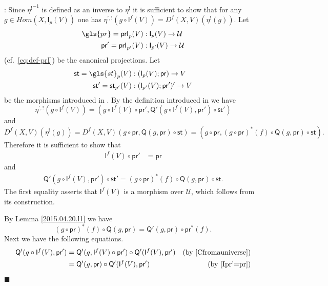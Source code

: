 \documentclass[12pt]{article}
\numberwithin{equation}{section}
\newenvironment{myproof}{{\bf Proof}:}{$\blacksquare$ \vskip 5mm }
\newcommand{\by}[1]{\text{(by #1)}}
\newcommand{\sr}{\rightarrow}
\newcommand{\U}{\mathcal{U}}
\newcommand{\I}{\mathsf{I}}
\newcommand{\Q}{\mathsf{Q}}
\newcommand{\etashriek}{\eta^!}
\newcommand{\etaunshriek}{{\etashriek}^{-1}}
\newcommand{\st}{\mathsf{st}}
\newcommand{\pr}{\mathsf{pr}}
\newcommand{\prI}{\mathsf{prI}}
\begin{document}
\begin{myproof}
Since $\etaunshriek$ is defined as an inverse to $\etashriek$ it is sufficient to show that
for any $g\in Hom(X,\I_p(V))$ one has $\eta^{',!}(g\circ
\I^f(V))=D^f(X,V)(\etashriek(g))$. Let
%
\begin{align*}
  \gls{pr}=\prI_p(V) & :\I_p(V)\sr \U \\
  \pr'=\prI_{p'}(V) & :\I_{p'}(V)\sr \U
\end{align*}
%
(cf.\ \eqref{eq:def-prI}) be the canonical projections. Let
%
\begin{align*}
  \st=\gls{st}_p(V)&:(\I_p(V);\pr)\sr V \\
  \st'=\st_{p'}(V)&:(\I_{p'}(V);\pr')'\sr V
\end{align*}
%
be the morphisms introduced in \cite[(2.60)]{presheavesOb}. By the definition introduced in \cite[(2.65)]{presheavesOb} we have
%
$$\eta^{',!}(g\circ \I^f(V))=(g\circ \I^f(V)\circ \pr', \Q'(g\circ \I^f(V), \pr')\circ \st')$$
%
and
%
$$D^f(X,V)(\etashriek(g))=D^f(X,V)(g\circ \pr, \Q(g,\pr)\circ \st)=(g\circ \pr, (g\circ \pr)^*(f)\circ \Q(g,\pr)\circ \st).$$
%
Therefore it is sufficient to show that
%
\begin{align}
  \I^f(V)\circ \pr' & =\pr \label{Ipr'=pr}
\end{align}
%
and
%
\begin{align}
   \Q'(g\circ \I^f(V), \pr')\circ \st'=(g\circ \pr)^*(f)\circ \Q(g,\pr)\circ \st.     \label{Q'stnat}
\end{align}
%
The first equality asserts that $\I^f(V)$ is a morphism over $\U$, which follows
from its construction.

By Lemma \ref{2015.04.20.l1} we have
%
\[(g\circ \pr)^*(f)\circ \Q(g,\pr)=\Q'(g,\pr)\circ \pr^*(f).\]
%
Next we have the following equations.
%
\begin{align*}
  \Q'(g\circ \I^f(V), \pr')
  & =\Q'(g,\I^f(V)\circ \pr')\circ \Q'(\I^f(V),\pr') & \by{\cite[Lemma 2.5]{Cfromauniverse}} \\
  & =\Q'(g,\pr)\circ \Q'(\I^f(V),\pr') & \by{\ref{Ipr'=pr}}
\end{align*}


\end{myproof}
\end{document}
